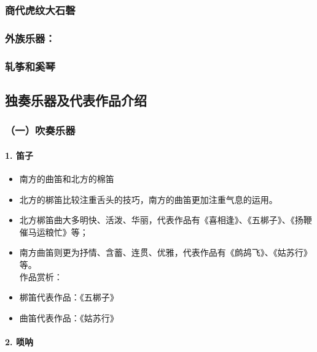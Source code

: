 \documentclass[
]{article}
\providecommand{\tightlist}{%
  \setlength{\itemsep}{0pt}\setlength{\parskip}{0pt}}
\begin{document}
\subsubsection{商代虎纹大石磬}\label{ux5546ux4ee3ux864eux7eb9ux5927ux77f3ux78ec}

\subsubsection{外族乐器：}\label{ux5916ux65cfux4e50ux5668}

\subsubsection{轧筝和奚琴}\label{ux8f67ux7b5dux548cux595aux7434}

\subsection{独奏乐器及代表作品介绍}\label{ux72ecux594fux4e50ux5668ux53caux4ee3ux8868ux4f5cux54c1ux4ecbux7ecd}

\subsubsection{（一）吹奏乐器}\label{ux4e00ux5439ux594fux4e50ux5668}

\paragraph{1. 笛子}\label{ux7b1bux5b50}

\begin{itemize}
\tightlist
\item
  南方的曲笛和北方的棉笛
\item
  北方的梆笛比较注重舌头的技巧，南方的曲笛更加注重气息的运用。
\item
  北方梆笛曲大多明快、活泼、华丽，代表作品有《喜相逢》、《五梆子》、《扬鞭催马运粮忙》等；
\item
  南方曲笛则更为抒情、含蓄、连贯、优雅，代表作品有《鹧鸪飞》、《姑苏行》等。\\
  作品赏析：
\item
  梆笛代表作品：《五梆子》
\item
  曲笛代表作品：《姑苏行》
\end{itemize}

\paragraph{2. 唢呐}\label{ux5522ux5450}
\end{document}
